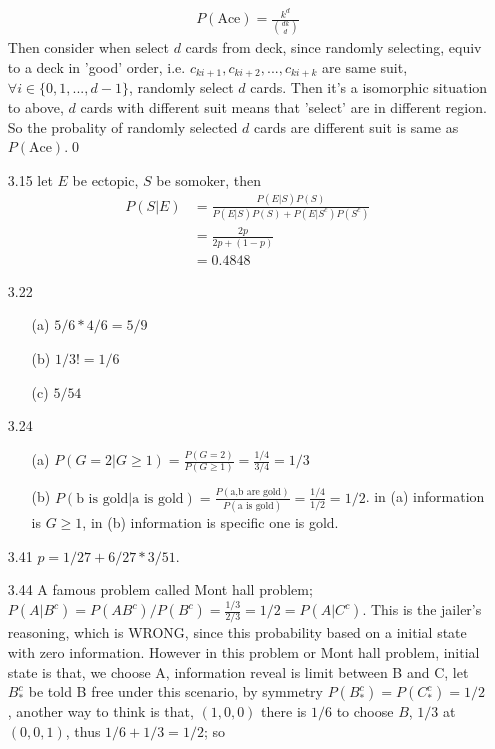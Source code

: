 \documentclass[paper=a4, fontsize=11pt]{scrartcl} %
\numberwithin{equation}{section} %
\numberwithin{figure}{section} %
\numberwithin{table}{section} %
\begin{document}
\begin{itemize}
	\begin{align}
		P(\text{Ace}) = \frac{k^d}{{dk \choose d}}
	\end{align}
	Then consider when select $d$ cards from deck, since randomly selecting, equiv to a deck in 'good' order, i.e. $c_{ki+1},c_{ki+2},...,c_{ki+k}$ are same suit, $\forall i\in\{0,1,...,d-1\}$, randomly select $d$ cards. Then it's a isomorphic situation to above, $d$ cards with different suit means that 'select' are in different region. So the probality of randomly selected $d$ cards are different suit is same as $P(\text{Ace})$.\qed
	\item[3.15]
	let $E$ be ectopic, $S$ be somoker, then
	\begin{align}
		P(S|E) &= \frac{ P(E|S)P(S) }{P(E|S)P(S)+ P(E|S^c)P(S^c)}\\
		&= \frac{2p}{2p + (1-p)} \\
		&= 0.4848
	\end{align}
	\item[3.22]
	\begin{itemize}
		\item[(a)] $5/6 * 4/6 = 5/9$
		\item[(b)] $1/3!=1/6$
		\item[(c)] $5/54$
	\end{itemize}
	\item[3.24]
	\begin{itemize}
		\item[(a)] $P(G=2|G\geq 1) = \frac{P(G=2)}{P(G\geq 1)} = \frac{1/4}{3/4} = 1/3$
		\item[(b)] $P(\text{b is gold}|\text{a is gold}) = \frac{P(\text{a,b are gold})}{ P (\text{a is gold})} = \frac{1/4}{1/2} = 1/2$. in (a) information is $G\geq 1$, in (b) information is specific one is gold.
	\end{itemize}
	\item[3.41] $p= 1/27 + 6/27 *3/51$.
	\item[3.44] A famous problem called Mont hall problem; $P(A|B^c) = P(AB^c)/P(B^c) = \frac{1/3}{2/3} = 1/2 = P(A|C^c)$. This is the jailer's reasoning, which is WRONG, since this probability based on a initial state with zero information. However in this problem or Mont hall problem, initial state is that, we choose A, information reveal is limit between B and C, let $B_*^c$ be told B free under this scenario, by symmetry $P(B_*^c)=P(C_*^c)= 1/2$, another way to think is that, $(1,0,0)$ there is $1/6$ to choose $B$, $1/3$ at $(0,0,1)$, thus $1/6+1/3=1/2$; so 
	\begin{align}

\end{align}
\end{itemize}
\end{document}
